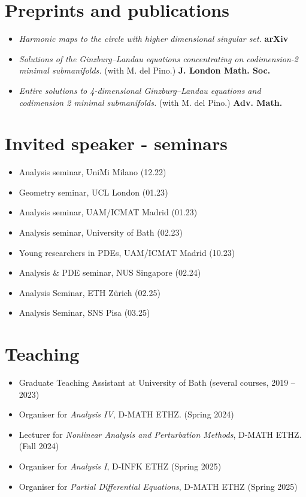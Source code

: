 \documentclass[a4paper,11pt]{article}
\begin{document}
\section*{Preprints and publications}
\noindent
\begin{itemize}
	\item \emph{Harmonic maps to the circle with higher dimensional singular set.} {\bf arXiv}
	\item \emph{Solutions of the Ginzburg--Landau equations concentrating on codimension-2 minimal submanifolds.} (with M. del Pino.) {\bf J. London Math. Soc.}
	\item \emph{Entire solutions to 4-dimensional Ginzburg--Landau equations and codimension 2 minimal submanifolds.} (with M. del Pino.) {\bf Adv. Math.}
\end{itemize}

\vspace{5mm}

\section*{Invited speaker - seminars}
\noindent
\begin{itemize}
	\item Analysis seminar, UniMi Milano ({12.22})
	\item Geometry seminar, UCL London ({01.23})
	\item Analysis seminar,  UAM/ICMAT Madrid (01.23)
	\item Analysis seminar, University of Bath (02.23)
	\item Young researchers in PDEs, UAM/ICMAT Madrid (10.23)
	\item Analysis \& PDE seminar, NUS Singapore (02.24)
	\item Analysis Seminar, ETH Z\"urich (02.25)
	\item Analysis Seminar, SNS Pisa (03.25)
\end{itemize}
\vspace{5mm}

\section*{Teaching}
\noindent
\begin{itemize}
	\item Graduate Teaching Assistant at University of Bath (several courses, 2019 -- 2023)
	\item Organiser for \emph{Analysis IV}, D-MATH ETHZ. (Spring 2024)
	\item Lecturer for \emph{Nonlinear Analysis and Perturbation Methods}, D-MATH ETHZ. (Fall 2024)
	\item Organiser for \emph{Analysis I}, D-INFK ETHZ (Spring 2025)
	\item Organiser for \emph{Partial Differential Equations}, D-MATH ETHZ (Spring 2025)
\end{itemize}
\vspace{5mm}
\end{document}

